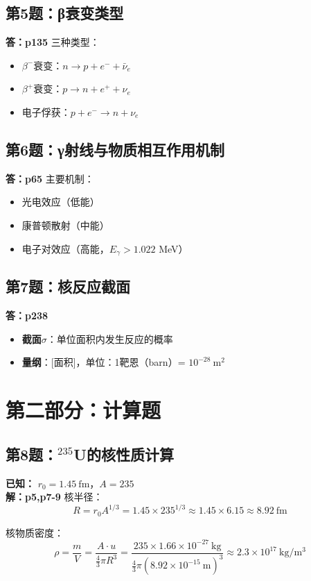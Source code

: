 \documentclass{article}
\begin{document}
\subsection*{第5题：β衰变类型}
\textbf{答：p135} 三种类型：
\begin{itemize}
  \item $\beta^-$衰变：$n \to p + e^- + \bar{\nu}_e$
  \item $\beta^+$衰变：$p \to n + e^+ + \nu_e$
  \item 电子俘获：$p + e^- \to n + \nu_e$
\end{itemize}

\subsection*{第6题：γ射线与物质相互作用机制}
\textbf{答：p65} 主要机制：
\begin{itemize}
  \item 光电效应（低能）
  \item 康普顿散射（中能）
  \item 电子对效应（高能，$E_\gamma > 1.022$ MeV）
\end{itemize}

\subsection*{第7题：核反应截面}
\textbf{答：p238} 
\begin{itemize}
  \item \textbf{截面$\sigma$}：单位面积内发生反应的概率
  \item \textbf{量纲}：[面积]，单位：1靶恩（barn）= $10^{-28}\ \mathrm{m}^2$
\end{itemize}

\section*{第二部分：计算题}

\subsection*{第8题：$^{235}$U的核性质计算}
\textbf{已知：} $r_0 = 1.45\ \mathrm{fm}$，$A=235$\\
\textbf{解：p5,p7-9}
核半径：
$$ R = r_0 A^{1/3} = 1.45 \times 235^{1/3} \approx 1.45 \times 6.15 \approx 8.92\ \mathrm{fm} $$

核物质密度：
$$
\rho = \frac{m}{V} = \frac{A \cdot u}{\frac{4}{3}\pi R^3} = \frac{235 \times 1.66 \times 10^{-27}\ \mathrm{kg}}{\frac{4}{3}\pi (8.92 \times 10^{-15}\ \mathrm{m})^3} \approx 2.3 \times 10^{17}\ \mathrm{kg/m^3}
$$
\end{document}
